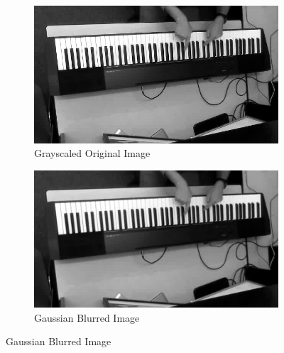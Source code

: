 \documentclass[10pt,twocolumn,letterpaper]{article}
\begin{document}
\begin{figure}[h!]
  \begin{subfigure}{0.23\textwidth}
    \includegraphics[width=\linewidth]{fig/1.jpg}
    \caption{Grayscaled Original Image} \label{fig:a}
  \end{subfigure}\hspace*{\fill}
  \begin{subfigure}{0.23\textwidth}
    \includegraphics[width=\linewidth]{fig/3.jpg}
    \caption{Gaussian Blurred Image} \label{fig:b}
  \end{subfigure}
  

\end{figure}
\end{document}

